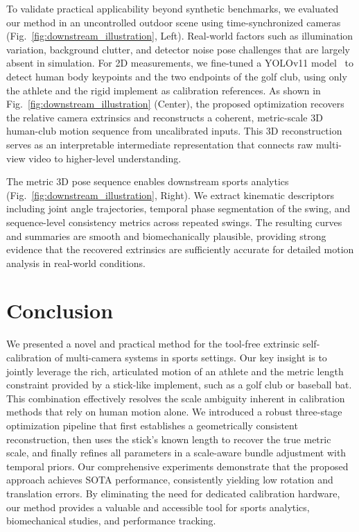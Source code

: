 \documentclass[a4paper, 10pt, conference]{ieeeconf}      %
\begin{document}
To validate practical applicability beyond synthetic benchmarks, we evaluated our method in an uncontrolled outdoor scene using time-synchronized cameras (Fig.~\ref{fig:downstream_illustration}, Left). Real-world factors such as illumination variation, background clutter, and detector noise pose challenges that are largely absent in simulation. For 2D measurements, we fine-tuned a YOLOv11 model~\cite{yolo11_ultralytics} to detect human body keypoints and the two endpoints of the golf club, using only the athlete and the rigid implement as calibration references.
As shown in Fig.~\ref{fig:downstream_illustration} (Center), the proposed optimization recovers the relative camera extrinsics and reconstructs a coherent, metric-scale 3D human-club motion sequence from uncalibrated inputs. This 3D reconstruction serves as an interpretable intermediate representation that connects raw multi-view video to higher-level understanding.

The metric 3D pose sequence enables downstream sports analytics (Fig.~\ref{fig:downstream_illustration}, Right). We extract kinematic descriptors including joint angle trajectories, temporal phase segmentation of the swing, and sequence-level consistency metrics across repeated swings. The resulting curves and summaries are smooth and biomechanically plausible, providing strong evidence that the recovered extrinsics are sufficiently accurate for detailed motion analysis in real-world conditions. 




\section{Conclusion}

We presented a novel and practical method for the tool-free extrinsic self-calibration of multi-camera systems in sports settings. Our key insight is to jointly leverage the rich, articulated motion of an athlete and the metric length constraint provided by a stick-like implement, such as a golf club or baseball bat. This combination effectively resolves the scale ambiguity inherent in calibration methods that rely on human motion alone. We introduced a robust three-stage optimization pipeline that first establishes a geometrically consistent reconstruction, then uses the stick's known length to recover the true metric scale, and finally refines all parameters in a scale-aware bundle adjustment with temporal priors. Our comprehensive experiments demonstrate that the proposed approach achieves SOTA performance, consistently yielding low rotation and translation errors. By eliminating the need for dedicated calibration hardware, our method provides a valuable and accessible tool for sports analytics, biomechanical studies, and performance tracking.
\end{document}
